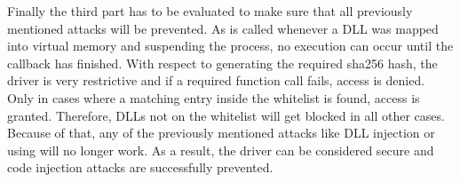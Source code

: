 Finally the third part has to be evaluated to make sure that all previously mentioned attacks will be prevented. As  is called whenever a DLL was mapped into virtual memory and suspending the process, no execution can occur until the callback has finished. With respect to generating the required sha256 hash, the driver is very restrictive and if a required function call fails, access is denied. Only in cases where a matching entry inside the whitelist is found, access is granted. Therefore, DLLs not on the whitelist will get blocked in all other cases. Because of that, any of the previously mentioned attacks like DLL injection or using  will no longer work. As a result, the driver can be considered secure and code injection attacks are successfully prevented.
